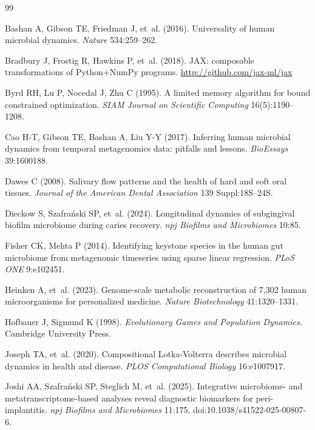 \documentclass[11pt,a4paper]{article}
\begin{document}

\begin{thebibliography}{99}

Bashan A, Gibson TE, Friedman J, et~al. (2016).
Universality of human microbial dynamics.
\textit{Nature} 534:259--262.

Bradbury J, Frostig R, Hawkins P, et~al. (2018).
JAX: composable transformations of Python+NumPy programs.
\url{http://github.com/jax-ml/jax}

Byrd RH, Lu P, Nocedal J, Zhu C (1995).
A limited memory algorithm for bound constrained optimization.
\textit{SIAM Journal on Scientific Computing} 16(5):1190--1208.

Cao H-T, Gibson TE, Bashan A, Liu Y-Y (2017).
Inferring human microbial dynamics from temporal metagenomics data: pitfalls and lessons.
\textit{BioEssays} 39:1600188.

Dawes C (2008). Salivary flow patterns and the health of hard and soft oral tissues.
\textit{Journal of the American Dental Association} 139 Suppl:18S--24S.

Dieckow S, Szafra\'{n}ski SP, et~al. (2024).
Longitudinal dynamics of subgingival biofilm microbiome during caries recovery.
\textit{npj Biofilms and Microbiomes} 10:85.

Fisher CK, Mehta P (2014). Identifying keystone species in the human gut microbiome
from metagenomic timeseries using sparse linear regression.
\textit{PLoS ONE} 9:e102451.

Heinken A, et~al. (2023). Genome-scale metabolic reconstruction of 7,302 human
microorganisms for personalized medicine.
\textit{Nature Biotechnology} 41:1320--1331.

Hofbauer J, Sigmund K (1998). \textit{Evolutionary Games and Population Dynamics}.
Cambridge University Press.

Joseph TA, et~al. (2020). Compositional Lotka-Volterra describes microbial dynamics
in health and disease.
\textit{PLOS Computational Biology} 16:e1007917.

Joshi AA, Szafrański SP, Steglich M, et~al. (2025). Integrative microbiome- and
metatranscriptome-based analyses reveal diagnostic biomarkers for peri-implantitis.
\textit{npj Biofilms and Microbiomes} 11:175. doi:10.1038/s41522-025-00807-6.


\end{thebibliography}
\end{document}
